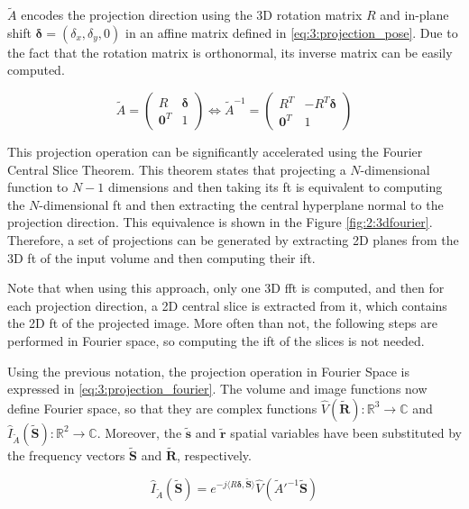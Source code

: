 \documentclass[../main.tex]{subfiles}
\begin{document}
$\tilde{A}$ encodes the projection direction using the 3D rotation matrix $R$ and in-plane shift $\bm{\delta} = (\delta_x, \delta_y, 0)$ in an affine matrix defined in \eqref{eq:3:projection_pose}. Due to the fact that the rotation matrix is orthonormal, its inverse matrix can be easily computed.

\begin{equation}\label{eq:3:projection_pose}
    \tilde{A} = 
    \begin{pmatrix}
        R & \bm{\delta} \\
        \bm{0}^T & 1
    \end{pmatrix}
    \Leftrightarrow
    \tilde{A}^{-1} = 
    \begin{pmatrix}
        R^T & -R^T\bm{\delta} \\
        \bm{0}^T & 1
    \end{pmatrix}
\end{equation}

This projection operation can be significantly accelerated using the Fourier Central Slice Theorem. This theorem states that projecting a $N$-dimensional function to $N-1$ dimensions and then taking its \gls{ft} is equivalent to computing the $N$-dimensional \gls{ft} and then extracting the central hyperplane normal to the projection direction\cite{kak2001}. This equivalence is shown in the Figure \ref{fig:2:3dfourier}. Therefore, a set of projections can be generated by extracting 2D planes from the 3D \gls{ft} of the input volume and then computing their \gls{ift}.

Note that when using this approach, only one 3D \gls{fft} is computed, and then for each projection direction, a 2D central slice is extracted from it, which contains the 2D \gls{ft} of the projected image. More often than not, the following steps are performed in Fourier space, so computing the \gls{ift} of the slices is not needed.

Using the previous notation, the projection operation in Fourier Space is expressed in \eqref{eq:3:projection_fourier}. The volume and image functions now define Fourier space, so that they are complex functions $\hat{V}(\bm{\tilde{R}}): \mathbb{R}^3 \rightarrow \mathbb{C}$ and $\hat{I}_{\tilde{A}}(\bm{\tilde{S}}): \mathbb{R}^2 \rightarrow \mathbb{C}$. Moreover, the $\bm{\tilde{s}}$ and $\bm{\tilde{r}}$ spatial variables have been substituted by the frequency vectors $\bm{\tilde{S}}$ and $\bm{\tilde{R}}$, respectively\cite{sorzano2017b}.

\begin{equation}\label{eq:3:projection_fourier}
    \hat{I}_{\tilde{A}}(\bm{\tilde{S}}) = e^{-j\langle R\bm{\delta, \bm{\tilde{S}}}\rangle}\hat{V}(\tilde{A}'^{-1}\bm{\tilde{S}})
\end{equation}
\end{document}
